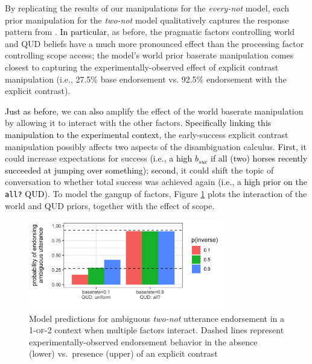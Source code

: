 \documentclass[cm]{glossa}
\newcommand{\lp}[1]{\textcolor{black}{#1}} %
\begin{document}
By replicating the results of our manipulations for the \emph{every-not} model, each prior manipulation for the \emph{two-not} model qualitatively captures the response pattern from \cite{musolinolidz2003}. 
\lp{In particular}, as before, the pragmatic factors controlling world and QUD beliefs have a much more pronounced effect than the processing factor controlling scope access; 
the model's world prior baserate manipulation comes closest to capturing the experimentally-observed effect of explicit contrast manipulation (i.e., 27.5\% base endorsement vs. 92.5\% endorsement with the explicit contrast). 

\lp{Just as before}, we can \lp{also} amplify the effect of the world baserate manipulation by allowing it to interact with the other factors. 
\lp{Specifically linking this manipulation to the experimental context,}
the early-success explicit contrast manipulation possibly affects two aspects of the disambiguation calculus.
\lp{First,} it could increase expectations for success 
\lp{(i.e., a high $b_{suc}$ if all (two) horses recently succeeded at jumping over something)};
\lp{second,} it could shift the topic of conversation to whether total success was achieved again
\lp{(i.e., a high prior on the \texttt{all?} QUD)}. 
To model the gangup of factors, Figure \ref{fig:interactions} plots the interaction of the world and QUD priors, together with the effect of scope.

\begin{figure}[!ht]
\centering
\includegraphics[height=1.55in]{two-not-pragmatic.png}
\caption{Model predictions for ambiguous \textit{two-not} utterance endorsement in a \textsc{1-of-2} context when multiple factors interact. Dashed lines represent experimentally-observed endorsement behavior in the absence (lower) vs.~presence (upper) of an explicit contrast}
\label{fig:interactions}
\end{figure}
\end{document}
